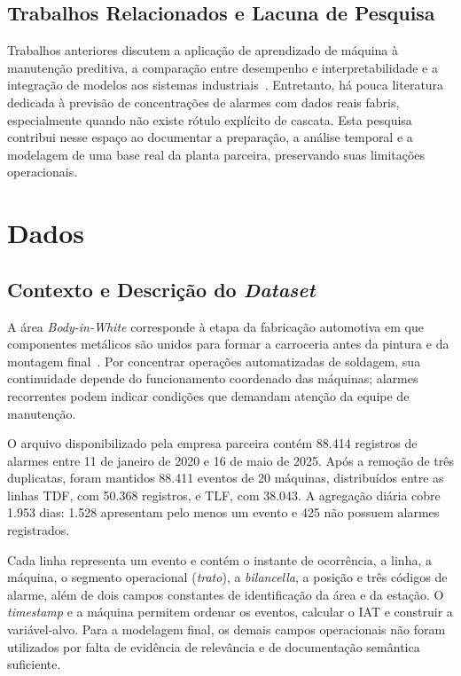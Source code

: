 \subsection{Trabalhos Relacionados e Lacuna de Pesquisa}

Trabalhos anteriores discutem a aplicação de aprendizado de máquina à manutenção preditiva, a comparação entre desempenho e interpretabilidade e a integração de modelos aos sistemas industriais~\cite{pdm_classifiers,pdm_models,zhao2025milling}. Entretanto, há pouca literatura dedicada à previsão de concentrações de alarmes com dados reais fabris, especialmente quando não existe rótulo explícito de cascata. Esta pesquisa contribui nesse espaço ao documentar a preparação, a análise temporal e a modelagem de uma base real da planta parceira, preservando suas limitações operacionais.

\section{Dados}
\label{sec:dados}

\subsection{Contexto e Descrição do \textit{Dataset}}

A área \textit{Body-in-White} corresponde à etapa da fabricação automotiva em que componentes metálicos são unidos para formar a carroceria antes da pintura e da montagem final~\cite{ssab_biw_soldagem}. Por concentrar operações automatizadas de soldagem, sua continuidade depende do funcionamento coordenado das máquinas; alarmes recorrentes podem indicar condições que demandam atenção da equipe de manutenção.

O arquivo disponibilizado pela empresa parceira contém 88.414 registros de alarmes entre 11 de janeiro de 2020 e 16 de maio de 2025. Após a remoção de três duplicatas, foram mantidos 88.411 eventos de 20 máquinas, distribuídos entre as linhas TDF, com 50.368 registros, e TLF, com 38.043. A agregação diária cobre 1.953 dias: 1.528 apresentam pelo menos um evento e 425 não possuem alarmes registrados.

Cada linha representa um evento e contém o instante de ocorrência, a linha, a máquina, o segmento operacional (\textit{trato}), a \textit{bilancella}, a posição e três códigos de alarme, além de dois campos constantes de identificação da área e da estação. O \textit{timestamp} e a máquina permitem ordenar os eventos, calcular o IAT e construir a variável-alvo. Para a modelagem final, os demais campos operacionais não foram utilizados por falta de evidência de relevância e de documentação semântica suficiente.

